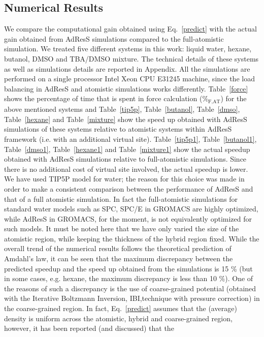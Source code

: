 \documentclass[a4paper,preprint,unsortedaddress]{revtex4-1}
\begin{document}
\subsection{Numerical Results}
We compare the computational gain obtained using Eq.~\ref{predict} with the actual gain
obtained from AdResS simulations compared to the full-atomistic simulation. We treated 
five different systems in this work: liquid water, hexane, butanol, DMSO and TBA/DMSO mixture.  
The technical details of these systems as well as simulations details are reported in 
Appendix. All the simulations are performed on a single processor Intel Xeon CPU E31245 machine,  
since the load balancing in AdResS and atomistic simulations works differently.
Table~\ref{force} shows the percentage of time that is spent in force calculation ($\%_\text{F,AT}$) 
for the above mentioned systems and Table~\ref{tip5p}, Table~\ref{butanol},  Table~\ref{dmso},  Table~\ref{hexane} and Table~\ref{mixture} show the speed up 
obtained with AdResS simulations of these systems relative to {atomistic systems within AdResS framework (i.e. with an additional virtual site).
Table~\ref{tip5p1}, Table~\ref{butanol1},  Table~\ref{dmso1},  Table~\ref{hexane1} and Table~\ref{mixture1} show the actual speedup obtained with AdResS simulations 
relative to full-atomistic simulations. Since there is no additional cost of virtual site involved, the actual speedup is lower.}
We have used TIP5P model for water; the reason for this choice was made in order to make a consistent comparison between the performance of AdResS and that of a full atomistic simulation. In fact the full-atomistic simulations for standard water models such
as SPC, SPC/E in GROMACS are highly optimized, while AdResS in GROMACS, for the moment, is not equivalently optimized for such models. It must 
be noted here that we have only varied the size of the atomistic region, while keeping the 
thickness of the hybrid region fixed. While the overall trend of the numerical results follows the theoretical prediction of Amdahl's law, it can be seen that the maximum discrepancy between the predicted 
speedup and the speed up obtained from the simulations is 15 \% (but in some cases, e.g. hexane, the 
maximum discrepancy is less than 10 \%). One of the reasons of such a discrepancy is the use of coarse-grained  potential (obtained with the Iterative Boltzmann Inversion, IBI,technique with
pressure correction) in the coarse-grained region. In fact, Eq.~\ref{predict} assumes that the (average) density is uniform across 
the atomistic, hybrid and coarse-grained region, however, it has been reported (and discussed) that the 
\end{document}
